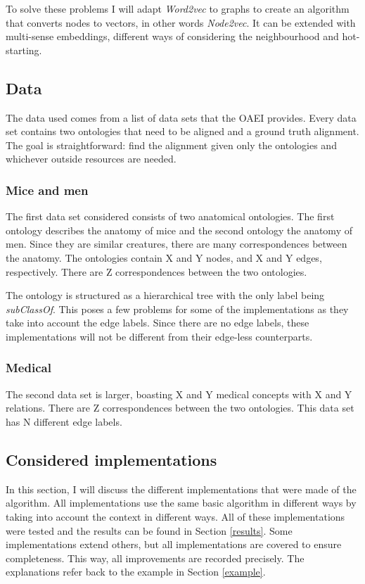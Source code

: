 \documentclass{article}
\begin{document}
 To solve these problems I will adapt \emph{Word2vec} to graphs to create an algorithm that converts nodes to vectors, in other words \emph{Node2vec}. It can be extended with multi-sense embeddings, different ways of considering the neighbourhood and hot-starting.
 
  \subsection{Data}
 The data used comes from a list of data sets that the OAEI provides\cite{euzenat2013ontology}.
 Every data set contains two ontologies that need to be aligned and a ground truth alignment. The goal is straightforward: find the alignment given only the ontologies and whichever outside resources are needed.

 \subsubsection{Mice and men}
 The first data set considered consists of two anatomical ontologies. The first ontology describes the anatomy of mice and the second ontology the anatomy of men. Since they are similar creatures, there are many correspondences between the anatomy. The ontologies contain X and Y nodes, and X and Y edges, respectively. There are Z correspondences between the two ontologies.
 
 The ontology is structured as a hierarchical tree with the only label being \emph{subClassOf}. This poses a few problems for some of the implementations as they take into account the edge labels. Since there are no edge labels, these implementations will not be different from their edge-less counterparts.
 \subsubsection{Medical}
 The second data set is larger, boasting X and Y medical concepts with X and Y relations. There are Z correspondences between the two ontologies. This data set has N different edge labels.
 
 \subsection{Considered implementations}
 In this section, I will discuss the different implementations that were made of the algorithm. All implementations use the same basic algorithm in different ways by taking into account the context in different ways. All of these implementations were tested and the results can be found in Section \ref{results}. Some implementations extend others, but all implementations are covered to ensure completeness. This way, all improvements are recorded precisely.
 The explanations refer back to the example in Section \ref{example}.
\end{document}
